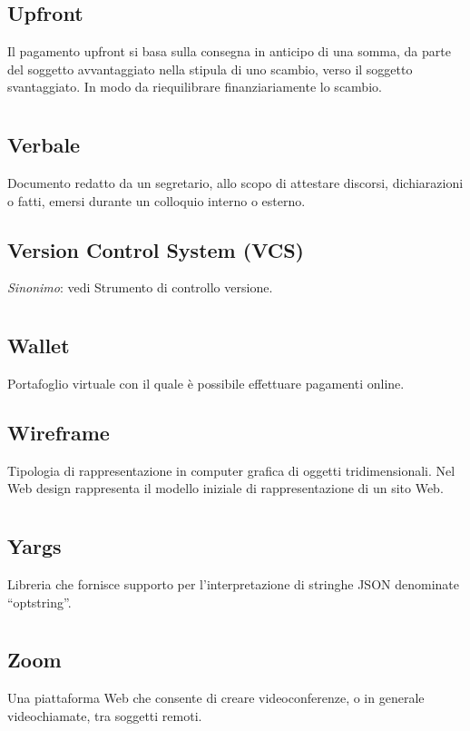 	\subsection*{Upfront}
	Il pagamento upfront si basa sulla consegna in anticipo di una somma, da parte del soggetto avvantaggiato nella stipula di uno scambio, verso il soggetto svantaggiato. In modo da riequilibrare finanziariamente lo scambio.
\pagebreak
\section[V]{}
	\subsection*{Verbale}
	Documento redatto da un segretario, allo scopo di attestare discorsi, dichiarazioni o fatti, emersi durante un colloquio interno o esterno.
	\subsection*{Version Control System (VCS)}
	\textit{Sinonimo}: vedi Strumento di controllo versione.
\pagebreak
\section[W]{}
	\subsection*{Wallet}
	Portafoglio virtuale con il quale è possibile effettuare pagamenti online.
	\subsection*{Wireframe}
	Tipologia di rappresentazione in computer grafica di oggetti tridimensionali. Nel Web design rappresenta il modello iniziale di rappresentazione di un sito Web.
\pagebreak
\section[Y]{}
	\subsection*{Yargs}
	Libreria che fornisce supporto per l’interpretazione di stringhe JSON denominate “optstring”.
\pagebreak
\section[Z]{}
	\subsection*{Zoom}
	Una piattaforma Web che consente di creare videoconferenze, o in generale videochiamate, tra soggetti remoti.
